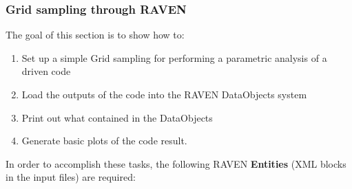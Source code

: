\subsubsection{Grid sampling through RAVEN}
\label{subsub:Gridexample}
The goal of this section is to show how to:
 \begin{enumerate}
   \item Set up a simple Grid sampling for performing a parametric analysis of a driven code
   \item Load the outputs of the code into the RAVEN DataObjects system
   \item Print out what contained in the DataObjects
   \item Generate basic plots of the code result.
\end{enumerate}  
In order to accomplish these tasks, the following RAVEN \textbf{Entities} (XML blocks in the input files) are required:
